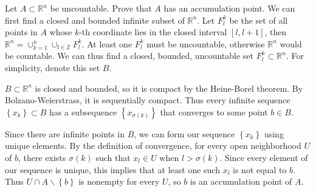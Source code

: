 \documentclass[10pt]{amsart}
\theoremstyle{plain}
\newenvironment{exercise}[1]{%
  \renewcommand\themanualtheoreminner{#1}%
  \manualtheoreminner
}{\endmanualtheoreminner}
\theoremstyle{definition}
\begin{document}
\begin{exercise}{3.36}
	Let $A \subset \mathbb{R}^n$ be uncountable. Prove that $A$ has an accumulation point.
	\hrulefill
\end{exercise}
We can first find a closed and bounded infinite subset of $\mathbb{R}^n$. Let $F_l^k$ be the set of all points in $A$ whose $k$-th coordinate lies in the closed interval $[l, l+1]$, then $\mathbb{R}^n = \cup_{k=1}^n \cup_{l\in \mathbb{Z}} F_l^k$. At least one $F_l^k$ must be uncountable, otherwise $\mathbb{R}^n$ would be countable. We can thus find a closed, bounded, uncountable set $F_l^k \subset \mathbb{R}^n$. For simplicity, denote this set $B$.

$B \subset \mathbb{R}^n$ is closed and bounded, so it is compact by the Heine-Borel theorem. By Bolzano-Weierstrass, it is sequentially compact. Thus every infinite sequence $\left\{ x_k \right\}\subset B$ has a subsequence $\left\{ x_{\sigma(k)} \right\}$ that converges to some point $b \in B$.

Since there are infinite points in $B$, we can form our sequence $\left\{ x_k \right\}$ using unique elements. By the definition of convergence, for every open neighborhood $U$ of $b$, there exists $\sigma(k)$ such that $x_{l}\in U$ when $l > \sigma(k)$. Since every element of our sequence is unique, this implies that at least one such $x_l$ is not equal to $b$. Thus $U \cap A\backslash \left\{ b \right\}$ is nonempty for every $U$, so $b$ is an accumulation point of $A$.
\end{document}
